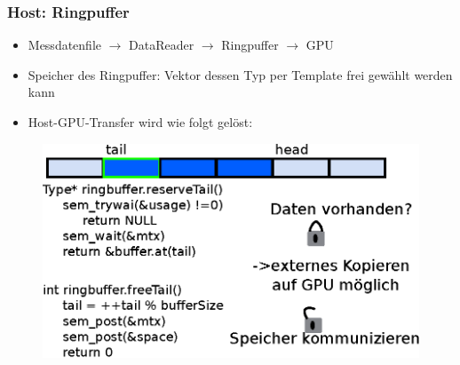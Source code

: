 \documentclass[ddcfooter]{tudbeamer}
\begin{document}
\begin{frame}
    \frametitle*{Host: Ringpuffer}
    \begin{itemize}
        \item Messdatenfile $\rightarrow$ DataReader $\rightarrow$ Ringpuffer $\rightarrow$ GPU
        \item Speicher des Ringpuffer: Vektor dessen Typ per Template frei gewählt werden kann
        \item Host-GPU-Transfer wird wie folgt gelöst:
    \end{itemize}
    \begin{figure}
        \centering
        \includegraphics[scale=.5]{Ringbuffer.eps}
    \end{figure}
\end{frame}
\end{document}
